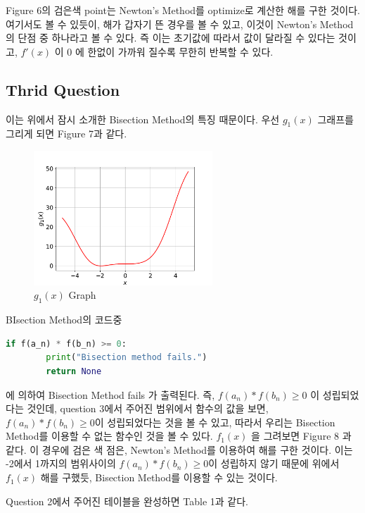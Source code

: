 \documentclass[11pt]{article}
\begin{document}
\noindent  
Figure 6의 검은색 point는 Newton's Method를 optimize로 계산한 해를 구한 것이다. 여기서도 볼 수 있듯이,  해가 갑자기 뜬 경우를 볼 수 있고, 이것이 Newton's Method의 단점 중 하나라고 볼 수 있다. 즉 이는 초기값에 따라서 값이 달라질 수 있다는 것이고, $f'(x)$ 이 0 에 한없이 가까워 질수록 무한히 반복할 수 있다.
\clearpage










\subsection{Thrid Question} 
이는 위에서 잠시 소개한 Bisection Method의 특징 때문이다. 우선 $g_1(x)$ 그래프를 그리게 되면 Figure 7과 같다. 
\begin{figure}[!ht]
  \centering
  \includegraphics[width=0.6\textwidth]{Bisectoin_Question2.pdf}
  \caption{$g_1(x)$ Graph}
\end{figure}

\noindent  
BIsection Method의 코드중 
\begin{lstlisting}[language=Python]
    if f(a_n) * f(b_n) >= 0:
        print("Bisection method fails.")
        return None
\end{lstlisting}
에 의하여 Bisection Method fails 가 출력된다. 즉, $f(a_n) * f(b_n) \geq 0$ 이 성립되었다는 것인데, question 3에서 주어진 범위에서 함수의 값을 보면, $ f(a_n) * f(b_n) \geq 0$이 성립되었다는 것을 볼 수 있고, 따라서 우리는 Bisection Method를 이용할 수 없는 함수인 것을 볼 수 있다. $f_1(x)$ 을 그려보면 Figure 8 과 같다. 이 경우에 검은 색 점은, Newton's Method를 이용하여 해를 구한 것이다. 이는 -2에서 1까지의 범위사이의 $ f(a_n) * f(b_n) \geq 0$이 성립하지 않기 때문에 위에서 $f_1(x)$ 해를 구했듯, Bisection Method를 이용할 수 있는 것이다.

\clearpage


\noindent  
Question 2에서 주어진 테이블을 완성하면 Table 1과 같다. 
\end{document}
